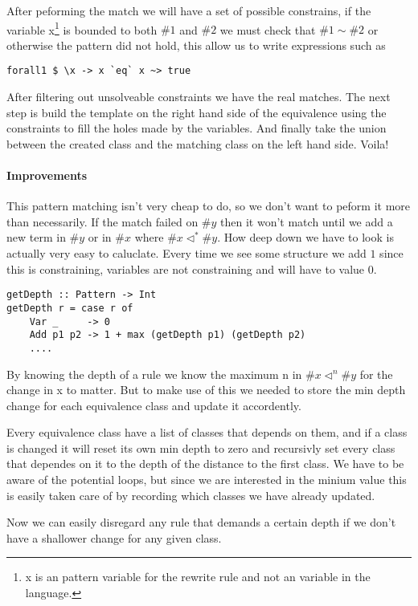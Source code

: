 After peforming the match we will have a set of possible constrains, if the variable x\footnote{x is an pattern variable for the rewrite rule and not an variable in the language.}
 is bounded to both $\#1$ and $\#2$ we must check that $\#1 \sim \#2$ or otherwise the pattern did not hold, this allow us to write expressions such as

\begin{verbatim}
forall1 $ \x -> x `eq` x ~> true
\end{verbatim}

After filtering out unsolveable constraints we have the real matches. The next step is build the template on the right hand side of the equivalence using the constraints to fill the holes made by the variables. And finally take the union between the created class and the matching class on the left hand side. Voila!

\paragraph{Improvements} This pattern matching isn't very cheap to do, so we don't want to peform it more than necessarily. If the match failed on $\#y$ then it won't match until we add a new term in $\#y$ or in $\#x$ where $\#x \lhd^* \#y$. How deep down we have to look is actually very easy to caluclate. Every time we see some structure we add $1$ since this is constraining, variables are not constraining and will have to value 0. 

\begin{verbatim}
getDepth :: Pattern -> Int
getDepth r = case r of
    Var _     -> 0
    Add p1 p2 -> 1 + max (getDepth p1) (getDepth p2)
    ....
\end{verbatim}

By knowing the depth of a rule we know the maximum n in $\#x \lhd^n \#y$ for the change in x to matter. But to make use of this we needed to store the min depth change for each equivalence class and update it accordently.

Every equivalence class have a list of classes that depends on them, and if a class is changed it will reset its own min depth to zero and recursivly set every class that dependes on it to the depth of the distance to the first class. We have to be aware of the potential loops, but since we are interested in the minium value this is easily taken care of by recording which classes we have already updated.

Now we can easily disregard any rule that demands a certain depth if we don't have a shallower change for any given class.


